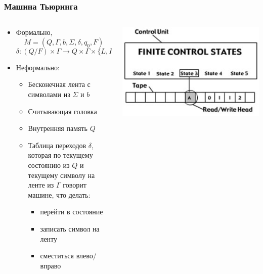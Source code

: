 \documentclass[xetex,mathserif,serif]{beamer}
\begin{document}
	\begin{frame}
		\frametitle{Машина Тьюринга}
		\begin{columns}
			\begin{column}{0.6\textwidth}
				\begin{itemize}
					\item Формально,
						$$M = (Q, \Gamma, b, \Sigma, \delta, q_0, F)$$
						$$\delta : (Q / F) × \Gamma \rightarrow Q × \Gamma × \{L, R\}$$
					\item Неформально:
					\begin{itemize}
						\item Бесконечная лента с символами из $\Sigma$ и $b$
						\item Считывающая головка
						\item Внутренняя память $Q$
						\item Таблица переходов $\delta$, которая по текущему состоянию из $Q$ и текущему символу на ленте из $\Gamma$ говорит машине, что делать:
						\begin{itemize}
							\item перейти в состояние
							\item записать символ на ленту
							\item сместиться влево/вправо
						\end{itemize}
					\end{itemize}
				\end{itemize}
			\end{column}
			\begin{column}{0.4\textwidth}
				\begin{center}
					\includegraphics[width=\textwidth]{turingMachine.png}
				\end{center}
			\end{column}
		\end{columns}
	\end{frame}
\end{document}
